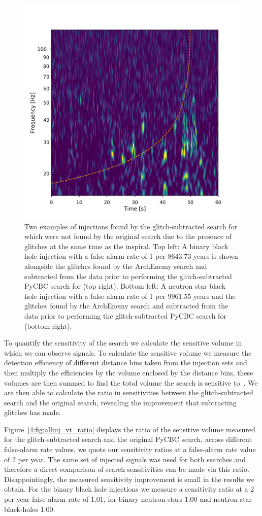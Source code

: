 \begin{figure}
\begin{minipage}[t]{1.0\linewidth}
    \includegraphics[width=0.49\linewidth]{images/4_archenemy/Section4/4.1/NSBH_H1_loud_Subtracted.pdf}
  \end{minipage}
    \caption{Two examples of \gw{} injections found by the glitch-subtracted search for \gws{} which were not found by the original \gw{} search due to the presence of \scl{} glitches at the same time as the \gw{} inspiral. Top left: A binary black hole injection with a false-alarm rate of 1 per $8643.73$ years is shown alongside the \scl{} glitches found by the ArchEnemy search and subtracted from the data prior to performing the glitch-subtracted PyCBC search for \gws{} (top right). Bottom left: A neutron star black hole injection with a false-alarm rate of 1 per $9961.55$ years and the \scl{} glitches found by the ArchEnemy search and subtracted from the data prior to performing the glitch-subtracted PyCBC search for \gws{} (bottom right).}
    \label{4:fig:ae_found}
\end{figure}

To quantify the sensitivity of the search we calculate the sensitive volume in which we can observe \gw{} signals. To calculate the sensitive volume we measure the detection efficiency of different distance bins taken from the injection sets and then multiply the efficiencies by the volume enclosed by the distance bins, these volumes are then summed to find the total volume the search is sensitive to~\cite{rw_snr_eq:2012}. We are then able to calculate the ratio in sensitivities between the glitch-subtracted \gw{} search and the original \gw{} search,  revealing the improvement that subtracting \scl{} glitches has made.

Figure~\ref{4:fig:allinj_vt_ratio} displays the ratio of the sensitive volume measured for the glitch-subtracted \gw{} search and the original PyCBC \gw{} search, across different false-alarm rate values, we quote our sensitivity ratios at a false-alarm rate value of 2 per year. The same set of injected signals was used for both \gw{} searches and therefore a direct comparison of search sensitivities can be made via this ratio. Disappointingly, the measured sensitivity improvement is small in the results we obtain. For the binary black hole injections we measure a sensitivity ratio at a 2 per year false-alarm rate of $1.01$, for binary neutron stars $1.00$ and neutron-star--black-holes $1.00$. 

